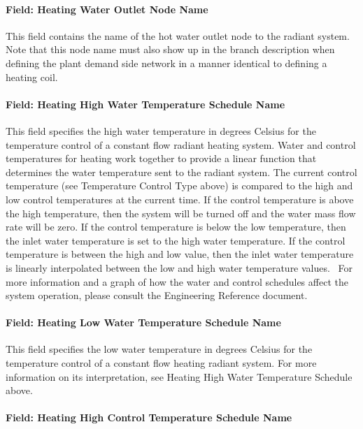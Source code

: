 \paragraph{Field: Heating Water Outlet Node Name}\label{field-heating-water-outlet-node-name-1}

This field contains the name of the hot water outlet node to the radiant system. Note that this node name must also show up in the branch description when defining the plant demand side network in a manner identical to defining a heating coil.

\paragraph{Field: Heating High Water Temperature Schedule Name}\label{field-heating-high-water-temperature-schedule-name}

This field specifies the high water temperature in degrees Celsius for the temperature control of a constant flow radiant heating system. Water and control temperatures for heating work together to provide a linear function that determines the water temperature sent to the radiant system. The current control temperature (see Temperature Control Type above) is compared to the high and low control temperatures at the current time. If the control temperature is above the high temperature, then the system will be turned off and the water mass flow rate will be zero. If the control temperature is below the low temperature, then the inlet water temperature is set to the high water temperature. If the control temperature is between the high and low value, then the inlet water temperature is linearly interpolated between the low and high water temperature values.~ For more information and a graph of how the water and control schedules affect the system operation, please consult the Engineering Reference document.

\paragraph{Field: Heating Low Water Temperature Schedule Name}\label{field-heating-low-water-temperature-schedule-name}

This field specifies the low water temperature in degrees Celsius for the temperature control of a constant flow heating radiant system. For more information on its interpretation, see Heating High Water Temperature Schedule above.

\paragraph{Field: Heating High Control Temperature Schedule Name}\label{field-heating-high-control-temperature-schedule-name}

